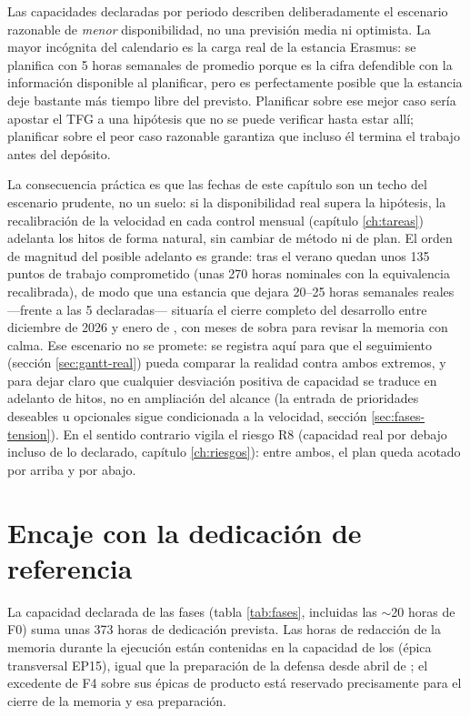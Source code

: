 Las capacidades declaradas por periodo describen deliberadamente el escenario razonable de \emph{menor} disponibilidad, no una previsión media ni optimista.
La mayor incógnita del calendario es la carga real de la estancia Erasmus: se planifica con 5 horas semanales de promedio porque es la cifra defendible con la información disponible al planificar, pero es perfectamente posible que la estancia deje bastante más tiempo libre del previsto.
Planificar sobre ese mejor caso sería apostar el \ac{TFG} a una hipótesis que no se puede verificar hasta estar allí; planificar sobre el peor caso razonable garantiza que incluso él termina el trabajo antes del depósito.

La consecuencia práctica es que las fechas de este capítulo son un techo del escenario prudente, no un suelo: si la disponibilidad real supera la hipótesis, la recalibración de la velocidad en cada control mensual (capítulo \ref{ch:tareas}) adelanta los hitos de forma natural, sin cambiar de método ni de plan.
El orden de magnitud del posible adelanto es grande: tras el verano quedan unos 135 puntos de trabajo comprometido (unas 270 horas nominales con la equivalencia recalibrada), de modo que una estancia que dejara 20--25 horas semanales reales —frente a las 5 declaradas— situaría el cierre completo del desarrollo entre diciembre de 2026 y enero de \thesisYear, con meses de sobra para revisar la memoria con calma.
Ese escenario no se promete: se registra aquí para que el seguimiento (sección \ref{sec:gantt-real}) pueda comparar la realidad contra ambos extremos, y para dejar claro que cualquier desviación positiva de capacidad se traduce en adelanto de hitos, no en ampliación del alcance (la entrada de prioridades deseables u opcionales sigue condicionada a la velocidad, sección \ref{sec:fases-tension}).
En el sentido contrario vigila el riesgo R8 (capacidad real por debajo incluso de lo declarado, capítulo \ref{ch:riesgos}): entre ambos, el plan queda acotado por arriba y por abajo.

\section{Encaje con la dedicación de referencia}
\label{sec:gantt-horas}

La capacidad declarada de las fases (tabla \ref{tab:fases}, incluidas las $\sim$20 horas de F0) suma unas 373 horas de dedicación prevista.
Las horas de redacción de la memoria durante la ejecución están contenidas en la capacidad de los  (épica transversal EP15), igual que la preparación de la defensa desde abril de \thesisYear; el excedente de F4 sobre sus épicas de producto está reservado precisamente para el cierre de la memoria y esa preparación.

